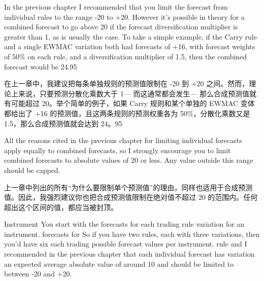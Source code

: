 
\begin{englishblock} In the previous chapter I recommended that you limit the forecast from individual rules to the range -20 to +20. However it's possible in theory for a combined forecast to go above 20 if the forecast diversification multiplier is greater than 1, as is usually the case. To take a simple example, if the Carry rule and a single EWMAC variation both had forecasts of +16, with forecast weights of 50\% on each rule, and a diversification multiplier of 1.5, then the combined forecast would be 24.95 \end{englishblock}

\begin{chineseblock}在上一章中，我建议把每条单独规则的预测值限制在 -20 到 +20 之间。然而，理论上来说，只要预测分散化乘数大于 1--- 而这通常都会发生--- 那么合成预测值就有可能超过 20。举个简单的例子，如果 Carry 规则和某个单独的 EWMAC 变体都给出了 +16 的预测值，且这两条规则的预测权重各为 50\%，分散化乘数又是 1.5，那么合成预测值就会达到 24。95 \end{chineseblock}

\bipairgap

\begin{englishblock} All the reasons cited in the previous chapter for limiting individual forecasts apply equally to combined forecasts, so I strongly encourage you to limit combined forecasts to absolute values of 20 or less. Any value outside this range should be capped. \end{englishblock}

\begin{chineseblock}上一章中列出的所有“为什么要限制单个预测值”的理由，同样也适用于合成预测值。因此，我强烈建议你也把合成预测值限制在绝对值不超过 20 的范围内。任何超出这个区间的值，都应当被封顶。\end{chineseblock}


\begin{englishblock} Instrument You start with the forecasts for each trading rule variation for an instrument. forecasts for So if you have two rules, each with three variations, then you'd have six each trading possible forecast values per instrument. rule and I recommended in the previous chapter that each individual forecast has variation an expected average absolute value of around 10 and should be limited to between -20 and +20. \end{englishblock}

